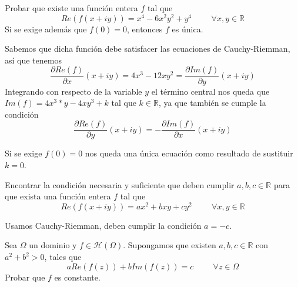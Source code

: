 \begin{ejer}
	Probar que existe una función entera $f$ tal que
	$$Re(f(x+iy)) = x^4-6x^2y^2+y^4 \hspace{1cm}\forall x,y\in\mathbb{R}$$
	Si se exige además que $f(0)=0$, entonces $f$ es única.
\end{ejer}
\begin{sol}
Sabemos que dicha función debe satisfacer las ecuaciones de Cauchy-Riemman, así que tenemos
$$ \frac{\partial Re(f)}{\partial x}(x+iy) = 4x^3-12xy^2 = \frac{\partial Im(f)}{\partial y}(x+iy) $$
Integrando con respecto de la variable $y$ el término central nos queda que
$Im(f) = 4x^3*y - 4xy^3+k$ tal que $k\in\mathbb{R}$, ya que también se cumple la condición 
$$ \frac{\partial Re(f)}{\partial y} (x+iy) = -\frac{\partial Im(f)}{\partial x} (x+iy) $$

Si se exige $f(0)=0$ nos queda una única ecuación como resultado de sustituir $k=0$.
\end{sol}

\begin{ejer}
	Encontrar la condición necesaria y suficiente que deben cumplir $a,b,c\in\mathbb{R}$ para que exista una función entera $f$ tal que
	$$ Re(f(x+iy)) = ax^2+bxy+cy^2\hspace{1cm}\forall x,y\in\mathbb{R} $$
\end{ejer}
Usamos Cauchy-Riemman, deben cumplir la condición $a=-c$.


\begin{ejer}
	Sea $\Omega$ un dominio y $f\in\mathcal{H}(\Omega)$. Supongamos que existen $a,b,c\in\mathbb{R}$ con $a^2+b^2>0$, tales que
	$$ aRe(f(z)) + bIm(f(z)) = c\hspace{1cm} \forall z\in\Omega $$
	Probar que $f$ es constante.
\end{ejer}

